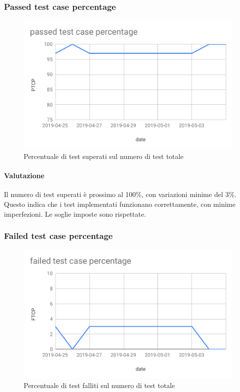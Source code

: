 \subsubsection{Passed test case percentage}
\begin{figure}[H]
	\centering
	\includegraphics[scale=0.7]{res/images/RA/ptcp.pdf}
	\caption{Percentuale di test superati sul numero di test totale}
\end{figure}
\paragraph*{Valutazione}
Il numero di test superati è prossimo al 100\%, con variazioni minime del 3\%. Questo indica che i test implementati funzionano correttamente, con minime imperfezioni. Le soglie imposte sono rispettate.

\subsubsection{Failed test case percentage}
\begin{figure}[H]
	\centering
	\includegraphics[scale=0.7]{res/images/RA/ftcp.pdf}
	\caption{Percentuale di test falliti sul numero di test totale}
\end{figure}
